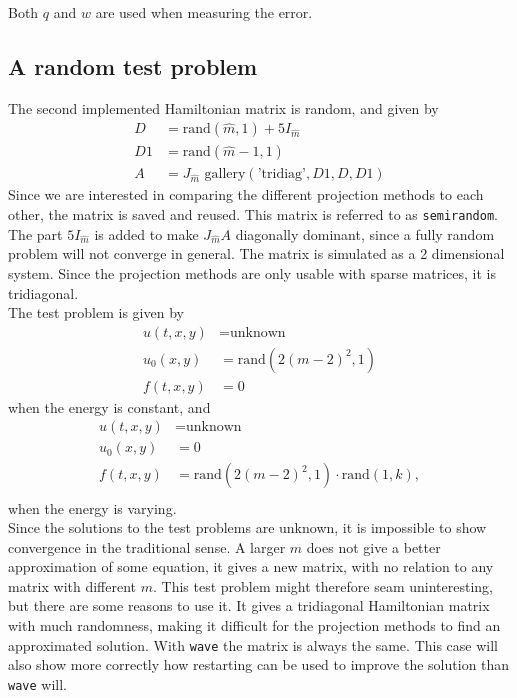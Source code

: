 \noindent Both $q$ and $w$ are used when measuring the error. \\

\subsection{A random test problem} %
The second implemented Hamiltonian matrix is random, and given by
\begin{equation*}
\begin{aligned}
D &= \text{rand}(\hat{m},1) + 5 I_{\hat{m}} \\
D1 & = \text{rand}(\hat{m}-1,1) \\
A &= J_{\hat{m}} \text{ gallery}(\text{'tridiag'},D1,D,D1)
\end{aligned}
\end{equation*}
Since we are interested in comparing the different projection methods to each other, the matrix is saved and reused. This matrix is referred to as \texttt{semirandom}. The part $5 I_{\hat{m}} $ is added to make $J_{\hat{m}}A$ diagonally dominant, since a fully random problem will not converge in general. The matrix is simulated as a 2 dimensional system. Since the projection methods are only usable with sparse matrices, it is tridiagonal.\\
The test problem is given by
\begin{equation*}
\begin{aligned}
u(t,x,y) &= \text{unknown} \\
u_0(x,y) &= \text{rand} (2 (m-2)^2,1) \\
f(t,x,y) &= 0
\end{aligned}
\end{equation*}
when the energy is constant, and 
\begin{equation*}
\begin{aligned}
u(t,x,y) &= \text{unknown} \\
u_0(x,y) &= 0 \\
f(t,x,y) &= \text{rand} (2 (m-2)^2,1) \cdot \text{rand}(1,k), \\
\end{aligned}
\end{equation*}
when the energy is varying.\\

\noindent Since the solutions to the test problems are unknown, it is impossible to show convergence in the traditional sense. A larger $m$ does not give a better approximation of some equation, it gives a new matrix, with no relation to any matrix with different $m$. This test problem might therefore seam uninteresting, but there are some reasons to use it. It gives a tridiagonal Hamiltonian matrix with much randomness, making it difficult for the projection methods to find an approximated solution. With \texttt{wave} the matrix is always the same. This case will also show more correctly how restarting can be used to improve the solution than \texttt{wave} will.  \\

